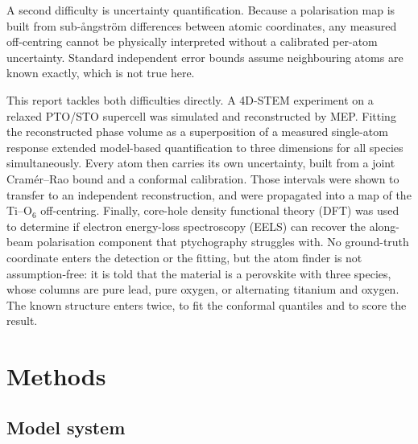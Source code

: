 \documentclass[aps,prb,twocolumn,superscriptaddress,floatfix,nofootinbib]{revtex4-2}
\begin{document}
A second difficulty is uncertainty quantification. Because a polarisation map is built from sub-\aa{}ngstr\"om differences between atomic coordinates, any measured off-centring cannot be physically interpreted without a calibrated per-atom uncertainty. Standard independent error bounds assume neighbouring atoms are known exactly, which is not true here.

This report tackles both difficulties directly. A 4D-STEM experiment on a relaxed PTO/STO supercell was simulated and reconstructed by MEP. Fitting the reconstructed phase volume as a superposition of a measured single-atom response extended model-based quantification \citep{DeBacker2016} to three dimensions for all species simultaneously. Every atom then carries its own uncertainty, built from a joint Cram\'er--Rao bound and a conformal calibration. Those intervals were shown to transfer to an independent reconstruction, and were propagated into a map of the Ti--O$_6$ off-centring. Finally, core-hole density functional theory (DFT) was used to determine if electron energy-loss spectroscopy (EELS) can recover the along-beam polarisation component that ptychography struggles with. No ground-truth coordinate enters the detection or the fitting, but the atom finder is not assumption-free: it is told that the material is a perovskite with three species, whose columns are pure lead, pure oxygen, or alternating titanium and oxygen. The known structure enters twice, to fit the conformal quantiles and to score the result.

\section{Methods}

\subsection{Model system}
\end{document}
